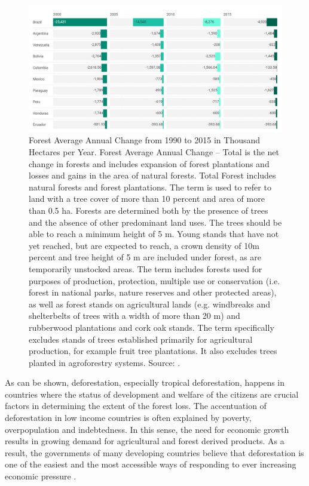 \begin{figure}[htpb]
\centering
\includegraphics[width=1\linewidth]{Introduction/forestchange_latinamerica.png}
\caption[Forest Average Annual Change from 1990 to 2015 in Thousand Hectares per Year.]{Forest Average Annual Change from 1990 to 2015 in Thousand Hectares per Year. Forest Average Annual Change – Total is the net change in forests and includes expansion of forest plantations and losses and gains in the area of natural forests. Total Forest includes natural forests and forest plantations. The term is used to refer to land with a tree cover of more than 10 percent and area of more than 0.5 ha. Forests are determined both by the presence of trees and the absence of other predominant land uses. The trees should be able to reach a minimum height of 5 m. Young stands that have not yet reached, but are expected to reach, a crown density of 10m percent and tree height of 5 m are included under forest, as are temporarily unstocked areas. The term includes forests used for purposes of production, protection, multiple use or conservation (i.e. forest in national parks, nature reserves and other protected areas), as well as forest stands on agricultural lands (e.g. windbreaks and shelterbelts of trees with a width of more than 20 m) and rubberwood plantations and cork oak stands. The term specifically excludes stands of trees established primarily for agricultural production, for example fruit tree plantations. It also excludes trees planted in agroforestry systems. Source: \citep{unep_2018}.}
\label{intro-fig:3}
\end{figure}

As can be shown, deforestation, especially tropical deforestation, happens in countries where the status of development and welfare of the citizens are crucial factors in determining the extent of the forest loss. The accentuation of deforestation in low income countries is often explained by poverty, overpopulation and indebtedness. In this sense, the need for economic growth results in growing demand for agricultural and forest derived products. As a result, the governments of many developing countries believe that deforestation is one of the easiest and the most accessible ways of responding to ever increasing economic pressure \citep{culas11}.

